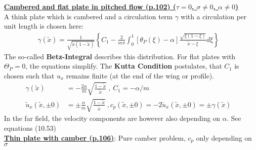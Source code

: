 \documentclass[8pt, landscape, fleqn]{scrartcl}
\begin{document}
\begin{multicols*}{3}
\underline{\textbf{Cambered and flat plate in pitched flow (p.102) ($\tau = 0$, $\sigma \neq 0$, $\alpha \neq 0$)}} \\
A think plate which is cambered and a circulation term $\gamma$ with a circulation per unit length is chosen here:
\begin{align*}
    \gamma(\tilde{x}) = \frac{1}{\sqrt{\tilde{x}(1-\tilde{x})}} \left\{ C_1 - \frac{2}{m\pi}\int_0^1 \left[ \theta_P(\xi)-\alpha \right]\frac{\sqrt{\xi(1-\xi)}}{\tilde{x}-\xi} d\xi \right\}
\end{align*}
The so-called \textbf{Betz-Integral} describes this distribution. For flat plates with $\Theta_P = 0$, the equations simplify. The \textbf{Kutta Condition} postulates, that $C_1$ is chosen such that $u_x$ remains finite (at the end of the wing or profile).
\begin{align*}
    \gamma(\tilde{x}) &= -\frac{2\alpha}{m}\sqrt{\frac{1-\tilde{x}}{\tilde{x}}}~,~C_1 = -\alpha / m \\
    \tilde{u}_x(\tilde{x}, \pm 0) &= \pm \frac{\alpha}{m}\sqrt{\frac{1-\tilde{x}}{\tilde{x}}}~,c_p(\tilde{x}, \pm 0) = -2\tilde{u}_x(\tilde{x},\pm 0) = \pm \gamma(\tilde{x})
\end{align*}
In the far field, the velocity components are however also depending on $\alpha$. See equations (10.53) \\

\underline{\textbf{Thin plate with camber (p.106)}}: Pure camber problem, $c_p$ only depending on $\sigma$ \\


\end{multicols*}
\end{document}
